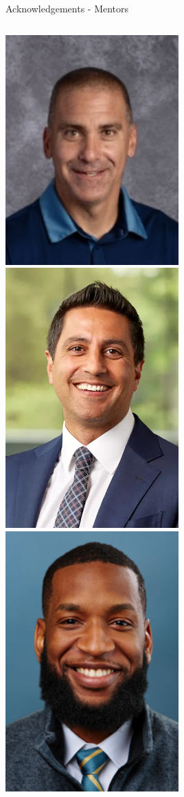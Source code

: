 \documentclass[aspectratio=169]{beamer}
\begin{document}
\begin{frame}{Acknowledgements - Mentors}
\begin{columns}
            \includegraphics[width=0.5\textwidth]{people/coaches/deli.png}   
            \centering
            \includegraphics[width=0.5\textwidth]{people/docs/cardoos.png}
            \includegraphics[width=0.5\textwidth]{people/docs/chukwueloka.png}

\end{columns}
\end{frame}
\end{document}
